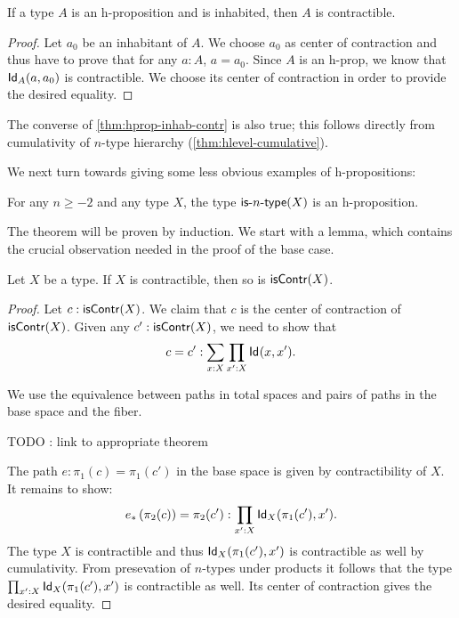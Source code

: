 \begin{thm}\label{thm:hprop-inhab-contr}
 If a type $A$ is an h-proposition and is inhabited, then $A$ is contractible.
\end{thm}

\begin{proof}
 Let $a_0$ be an inhabitant of $A$. We choose $a_0$ as center of contraction and thus have to
  prove that for any $a : A$, $a = a_0$.
  Since $A$ is an h-prop, we know that $\idtype[A]{a}{a_0}$ is contractible.
  We choose its center of contraction in order to provide the desired equality.
\end{proof}

\begin{rmk}\label{rem:is-contr-implies-isaprop-and-element}
 The converse of \autoref{thm:hprop-inhab-contr} is also true; this follows directly from cumulativity of $n$-type hierarchy (\autoref{thm:hlevel-cumulative}).
\end{rmk}

We next turn towards giving some less obvious examples of h-propositions:

\begin{thm}\label{thm:isaprop-isofhlevel}
 For any $n \geq -2$ and any type $X$, the type $\istype{n}(X)$ is an h-proposition.
\end{thm}

The theorem will be proven by induction. We start with a lemma, which contains the crucial observation needed in the proof of the base case.

\begin{lem}\label{lem:contr-contr-is-contr}
  Let $X$ be a type. If $X$ is contractible, then so is $\iscontr(X)$.
\end{lem}

\begin{proof}
 Let $c : \iscontr(X)$. We claim that $c$ is the center of contraction of $\iscontr (X)$.
  Given any $c' : \iscontr (X)$, we need to show that
       \[ c = c' : \sum_{x:X}\prod_{x':X}\idtype{x}{x'}  . \]

 We use the equivalence between paths in total spaces and pairs of paths in the base space and the fiber.

 TODO : link to appropriate theorem

 The path $e : \pi_1(c) = \pi_1 (c')$ in the base space is given by contractibility of $X$.
 It remains to show:
 \[ \trans{e}{\pi_2(c)} = \pi_2 (c') : \prod_{x' : X} \idtype[X]{\pi_1 (c')} {x'}  .  \]
 The type $X$ is contractible and thus $\idtype[X]{\pi_1 (c')} {x'}$ is contractible as well by cumulativity.
From presevation of $n$-types under products it follows that the type $\prod_{x' : X} \idtype[X]{\pi_1 (c')} {x'}$
  is contractible as well. Its center of contraction gives the desired equality.
\end{proof}

